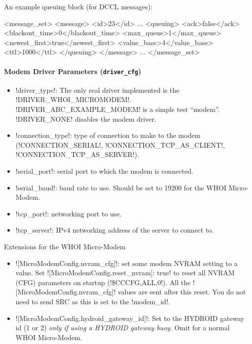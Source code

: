 An example queuing block (for DCCL messages):
\begin{small}
\begin{boxedverbatim}
<message_set>
  <message>
    <id>23</id>
    ...
    <queuing>
      <ack>false</ack>
      <blackout_time>0</blackout_time>
      <max_queue>1</max_queue>
      <newest_first>true</newest_first>
      <value_base>4</value_base>
      <ttl>1000</ttl>
    </queuing>
  </message>
  ...
</message_set>
\end{boxedverbatim}
\resetbvlinenumber
\end{small}

\paragraph{Modem Driver Parameters (\texttt{driver\_cfg})}
\begin{itemize}
\item !driver_type!: The only real driver implemented is the !DRIVER_WHOI_MICROMODEM!. !DRIVER_ABC_EXAMPLE_MODEM! is a simple test ``modem''. !DRIVER_NONE! disables the modem driver.
\item !connection_type!: type of connection to make to the modem (!CONNECTION_SERIAL!, !CONNECTION_TCP_AS_CLIENT!, !CONNECTION_TCP_AS_SERVER!).
\item !serial_port!: serial port to which the modem is connected.
\item !serial_baud!: baud rate to use. Should be set to 19200 for the WHOI Micro-Modem.
\item !tcp_port!: networking port to use. 
\item !tcp_server!: IPv4 networking address of the server to connect to. 
\end{itemize}

Extensions for the WHOI Micro-Modem
\begin{itemize}
\item ![MicroModemConfig.nvram_cfg]!: set some modem NVRAM setting to a value. Set ![MicroModemConfig.reset_nvram]: true! to reset all NVRAM (CFG) parameters on startup (!\$CCCFG,ALL,0!). All the ![MicroModemConfig.nvram_cfg]! values are sent after this reset. You do not need to send SRC as this is set to the !modem_id!.
\item  ![MicroModemConfig.hydroid_gateway_id]!: Set to the HYDROID gateway id (1 or 2) \textit{only if using a HYDROID gateway buoy}. Omit for a normal WHOI Micro-Modem.
\end{itemize} 

